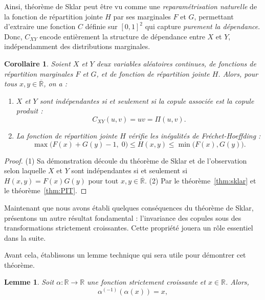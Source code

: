 \documentclass[a4paper,11pt]{amsbook}
\numberwithin{equation}{chapter}
\newtheorem{corollaire}	[theoreme]	 {Corollaire}
\newtheorem{lemme}	    [theoreme]	 {Lemme}
\theoremstyle{definition}
\begin{document}
Ainsi, théorème de Sklar peut être vu comme une \emph{reparamétrisation naturelle} de la fonction de répartition jointe \( H \) par ses marginales \( F \) et \( G \), permettant d’extraire une fonction \( C \) définie sur \( [0,1]^2 \) qui capture \emph{purement la dépendance}.
Donc, \( C_{XY} \) encode entièrement la structure de dépendance entre \( X \) et \( Y \), indépendamment des distributions marginales.

\begin{corollaire}\label{cor:sklar}
Soient \( X \) et \( Y \) deux variables aléatoires continues, de fonctions de répartition marginales \( F \) et \( G \), et de fonction de répartition jointe \( H \). Alors, pour tous \( x, y \in \overline{\mathbb{R}} \), on a :
\begin{enumerate}
    \item \( X \) et \( Y \) sont indépendantes si et seulement si la copule associée est la copule produit : 
    \[
    C_{XY}(u,v) = uv = \Pi(u,v).
    \]
    
    \item La fonction de répartition jointe \( H \) vérifie les inégalités de Fréchet-Hoeffding :
    \[
    \max\big(F(x) + G(y) - 1,\; 0\big) \leq H(x,y) \leq \min\big(F(x), G(y)\big).
    \]
\end{enumerate}
\end{corollaire}

\begin{proof}
(1)
Sa démonstration découle du théorème de Sklar et de l'observation selon laquelle \(X\) et \(Y\) sont indépendantes si et seulement si \(H(x,y) = F(x)G(y)\) pour tout \(x, y \in \overline{\mathbb{R}}\).
(2)
Par le théorème~\ref{thm:sklar} et le théorème~\ref{thm:PIT}.
\end{proof}

Maintenant que nous avons établi quelques conséquences du théorème de Sklar, présentons un autre résultat fondamental : l’invariance des copules sous des transformations strictement croissantes. Cette propriété jouera un rôle essentiel dans la suite.

Avant cela, établissons un lemme technique qui sera utile pour démontrer cet théorème.

\begin{lemme}\label{lemme:FSC}
Soit \(\alpha : \mathbb{R} \to \mathbb{R}\) une fonction strictement croissante et \(x \in \mathbb{R}\). Alors,
\[
\alpha^{(-1)}(\alpha(x)) = x,
\]

\end{lemme}
\end{document}
